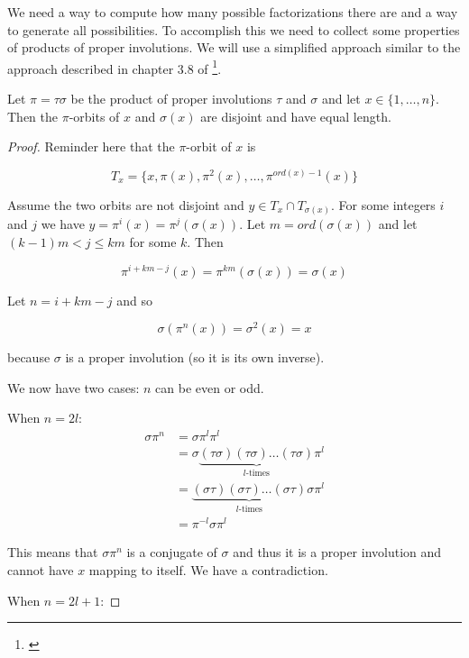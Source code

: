 We need a way to compute how many possible factorizations there are and a way to generate all possibilities. To accomplish this we need to collect some properties of products of proper involutions. We will use a simplified approach similar to the approach described in chapter 3.8 of \citet{lawrence2021introduction}\footnote{\cite{lawrence2021introduction}}.

\begin{thm}\label{involutionproduct}
Let $\pi = \tau \sigma$ be the product of proper involutions $\tau$ and $\sigma$ and let $x \in \{1, \ldots, n\}$. Then the $\pi$-orbits of $x$ and $\sigma(x)$ are disjoint and have equal length.
\end{thm}

\begin{proof}

Reminder here that the $\pi$-orbit of $x$ is 

$$
T_x = \{x, \pi(x), \pi^2(x), \ldots, \pi^{ord(x)-1}(x)\}
$$

Assume the two orbits are not disjoint and $y \in T_x \cap T_{\sigma(x)}$. For some integers $i$ and $j$ we have $y = \pi^i(x) = \pi^j(\sigma(x))$. Let $m = ord(\sigma(x))$ and let $(k - 1) m < j \leq k m$ for some $k$. Then 

$$
\pi^{i + k m - j} (x) = \pi^{k m} (\sigma(x)) = \sigma(x)
$$

Let $n = i + k m - j$ and so

$$
\sigma (\pi^n (x)) = \sigma^2(x) = x
$$

because $\sigma$ is a proper involution (so it is its own inverse).

We now have two cases: $n$ can be even or odd.

When $n = 2 l$:
\begin{align*}
\sigma \pi^n &= \sigma \pi^l \pi^l \\
           &= \sigma \underbrace{(\tau\sigma) (\tau\sigma) \ldots (\tau\sigma)}_{l\text{-times}}  \pi^l \\
           &= \underbrace{(\sigma \tau) (\sigma \tau) \ldots (\sigma \tau)}_{l\text{-times}} \sigma \pi^l \\
           &= \pi^{-l} \sigma \pi^l
\end{align*}

This means that $\sigma \pi^n$ is a conjugate of $\sigma$ and thus it is a proper involution and cannot have $x$ mapping to itself. We have a contradiction.

When $n = 2 l + 1$:


\end{proof}
